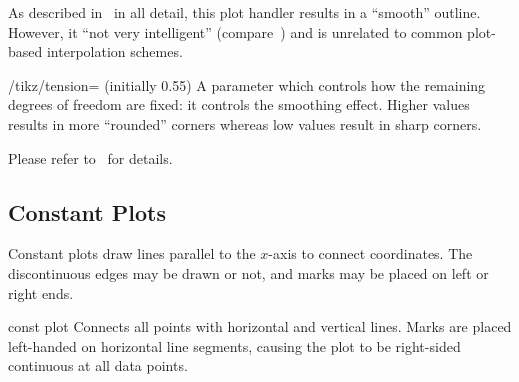 {As described in~\cite{tikz} in all detail, this plot handler results in a
``smooth'' outline. However, it ``not very intelligent'' (compare~\cite{tikz})
and is unrelated to common plot-based interpolation schemes.

\begin{key}{/tikz/tension= (initially 0.55)}
    A parameter which controls how the remaining degrees of freedom are fixed:
    it controls the smoothing effect. Higher values results in more ``rounded''
    corners whereas low values result in sharp corners.

    Please refer to~\cite{tikz} for details.
\end{key}


\subsection{Constant Plots}

Constant plots draw lines parallel to the $x$-axis to connect coordinates. The
discontinuous edges may be drawn or not, and marks may be placed on left or
right ends.

\begin{plottype}{const plot}
    Connects all points with horizontal and vertical lines. Marks are placed
    left-handed on horizontal line segments, causing the plot to be right-sided
    continuous at all data points.

\begin{codeexample}[]
\end{codeexample}


\begin{codeexample}[]
\end{codeexample}
\end{plottype}

}
